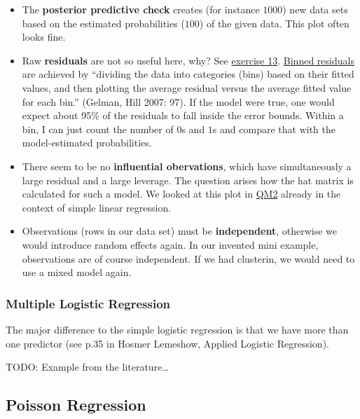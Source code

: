 \documentclass[
]{article}
\providecommand{\tightlist}{%
  \setlength{\itemsep}{0pt}\setlength{\parskip}{0pt}}
\begin{document}
\begin{itemize}
\tightlist
\item
  The \textbf{posterior predictive check} creates (for instance
  \(1000\)) new data sets based on the estimated probabilities (\(100\))
  of the given data. This plot often looks fine.
\item
  Raw \textbf{residuals} are not so useful here, why? See
  \hyperref[exercise13_LMM]{exercise 13}.
  \href{https://easystats.github.io/performance/reference/binned_residuals.html}{Binned
  residuals} are achieved by ``dividing the data into categories (bins)
  based on their fitted values, and then plotting the average residual
  versus the average fitted value for each bin.'' (Gelman, Hill 2007:
  97). If the model were true, one would expect about 95\% of the
  residuals to fall inside the error bounds. Within a bin, I can just
  count the number of \(0\)s and \(1\)s and compare that with the
  model-estimated probabilities.
\item
  There seem to be no \textbf{influential obervations}, which have
  simultaneously a large residual and a large leverage. The question
  arises how the hat matrix is calculated for such a model. We looked at
  this plot in
  \href{https://jdegenfellner.github.io/Script_QM2_ZHAW/simple-linear-regression.html\#influential-observations-middle-right}{QM2}
  already in the context of simple linear regression.
\item
  Observations (rows in our data set) must be \textbf{independent},
  otherwise we would introduce random effects again. In our invented
  mini example, observations are of course independent. If we had
  clusterin, we would need to use a mixed model again.
\end{itemize}

\subsubsection{Multiple Logistic
Regression}\label{multiple_logistic_regression}

The major difference to the simple logistic regression is that we have
more than one predictor (see p.35 in Hosmer Lemeshow, Applied Logistic
Regression).

TODO: Example from the literature\ldots{}

\subsection{Poisson Regression}\label{poisson-regression}
\end{document}
